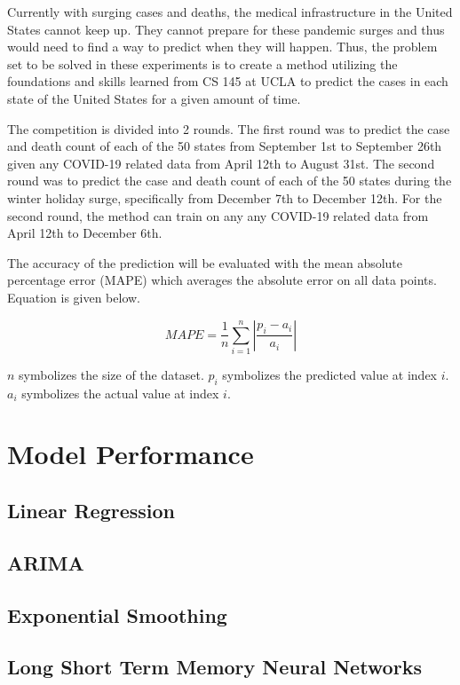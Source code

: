 \documentclass[sigconf,nonacm]{acmart}
\begin{document}
Currently with surging cases and deaths, the medical infrastructure in the
United States cannot keep up. They cannot prepare for these pandemic surges and
thus would need to find a way to predict when they will happen. Thus, the
problem set to be solved in these experiments is to create a method utilizing
the foundations and skills learned from CS 145 at UCLA to predict the cases in
each state of the United States for a given amount of time. 


The competition is divided into 2 rounds. The first round was to predict the
case and death count of each of the 50 states from September 1st to September
26th given any COVID-19 related data from April 12th to August 31st. The second
round was to predict the case and death count of each of the 50 states during
the winter holiday surge, specifically from December 7th to December 12th. For
the second round, the method can train on any any COVID-19 related data from
April 12th to December 6th. 

The accuracy of the prediction will be evaluated with the mean absolute
percentage error (MAPE) which averages the absolute error on all data points.
Equation is given below.

$$MAPE = \frac{1}{n} \sum_{i = 1}^{n} |\frac{p_i - a_i}{a_i} |$$

$n$ symbolizes the size of the dataset. $p_i$ symbolizes the predicted value at
index $i$. $a_i$ symbolizes the actual value at index $i$.


\section{Model Performance}
\subsection{Linear Regression}
\subsection{ARIMA}
\subsection{Exponential Smoothing}
\subsection{Long Short Term Memory Neural Networks}
\end{document}
